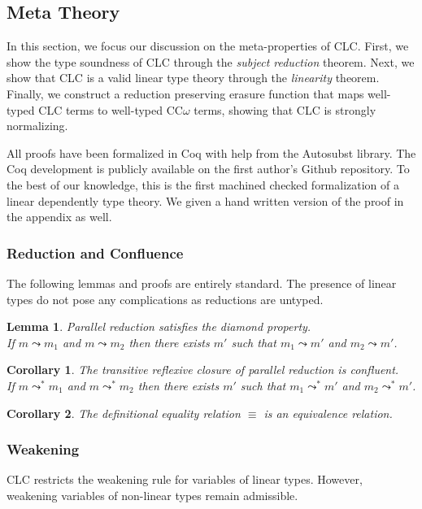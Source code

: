 \documentclass{article}
\newtheorem{corollary}{Corollary}[theorem]
\newtheorem{lemma}[theorem]{Lemma}
\theoremstyle{definition}
\newcommand{\pstep}{\leadsto}
\begin{document}
  \subsection{Meta Theory} \label{meta}
  In this section, we focus our discussion on the meta-properties of CLC. First, we show the type soundness of CLC through the \textit{subject reduction} theorem. Next, we show that CLC is a valid linear type theory through the \textit{linearity} theorem. Finally, we construct a reduction preserving erasure function that maps well-typed CLC terms to well-typed CC$\omega$ terms, showing that CLC is strongly normalizing.
  
  All proofs have been formalized in Coq with help from the Autosubst \cite{autosubst} library. The Coq development is publicly available on the first author's Github repository. To the best of our knowledge, this is the first machined checked formalization of a linear dependently type theory. We given a hand written version of the proof in the appendix as well.

  \subsubsection{Reduction and Confluence}

  The following lemmas and proofs are entirely standard. The presence of linear types do not pose any complications as reductions are untyped.

  \begin{lemma} Parallel reduction satisfies the diamond property. \\
    If $m \pstep m_1$ and $m \pstep m_2$ then there exists $m'$ such that $m_1 \pstep m'$ and $m_2 \pstep m'$.
  \end{lemma}

  \begin{corollary} The transitive reflexive closure of parallel reduction is confluent. \\ 
    If $m \pstep^* m_1$ and $m \pstep^* m_2$ then there exists $m'$ such that $m_1 \pstep^* m'$ and $m_2 \pstep^* m'$.
  \end{corollary}

  \begin{corollary}
    The definitional equality relation $\equiv$ is an equivalence relation.
  \end{corollary}

  \subsubsection{Weakening} \label{subst}
  CLC restricts the weakening rule for variables of linear types. However, weakening variables of non-linear types remain admissible.
\end{document}
